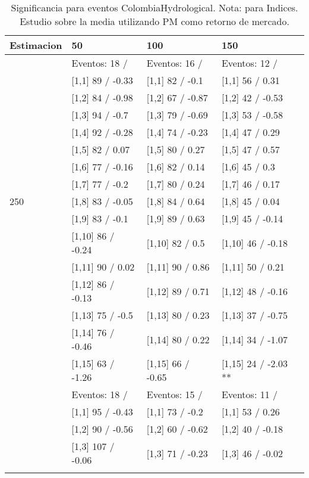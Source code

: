 \begin{table}

\caption{Significancia para eventos ColombiaHydrological. Nota: para Indices. Estudio sobre la media utilizando PM como retorno de mercado.}
\centering
\begin{tabular}[t]{llll}
\toprule
Estimacion & 50 & 100 & 150\\
\midrule
 & Eventos:  18 / & Eventos:  16 / & Eventos:  12 /\\
 & {}[1,1] 89  / -0.33 & {}[1,1] 82  / -0.1 & {}[1,1] 56  / 0.31\\
 & {}[1,2] 84  / -0.98 & {}[1,2] 67  / -0.87 & {}[1,2] 42  / -0.53\\
 & {}[1,3] 94  / -0.7 & {}[1,3] 79  / -0.69 & {}[1,3] 53  / -0.58\\
 & {}[1,4] 92  / -0.28 & {}[1,4] 74  / -0.23 & {}[1,4] 47  / 0.29\\
\addlinespace
 & {}[1,5] 82  / 0.07 & {}[1,5] 80  / 0.27 & {}[1,5] 47  / 0.57\\
 & {}[1,6] 77  / -0.16 & {}[1,6] 82  / 0.14 & {}[1,6] 45  / 0.3\\
 & {}[1,7] 77  / -0.2 & {}[1,7] 80  / 0.24 & {}[1,7] 46  / 0.17\\
250 & {}[1,8] 83  / -0.05 & {}[1,8] 84  / 0.64 & {}[1,8] 45  / 0.04\\
 & {}[1,9] 83  / -0.1 & {}[1,9] 89  / 0.63 & {}[1,9] 45  / -0.14\\
\addlinespace
 & {}[1,10] 86  / -0.24 & {}[1,10] 82  / 0.5 & {}[1,10] 46  / -0.18\\
 & {}[1,11] 90  / 0.02 & {}[1,11] 90  / 0.86 & {}[1,11] 50  / 0.21\\
 & {}[1,12] 86  / -0.13 & {}[1,12] 89  / 0.71 & {}[1,12] 48  / -0.16\\
 & {}[1,13] 75  / -0.5 & {}[1,13] 80  / 0.23 & {}[1,13] 37  / -0.75\\
 & {}[1,14] 76  / -0.46 & {}[1,14] 80  / 0.22 & {}[1,14] 34  / -1.07\\
\addlinespace
 & {}[1,15] 63  / -1.26 & {}[1,15] 66  / -0.65 & {}[1,15] 24  / -2.03 **\\
 & Eventos:  18 / & Eventos:  15 / & Eventos:  11 /\\
 & {}[1,1] 95  / -0.43 & {}[1,1] 73  / -0.2 & {}[1,1] 53  / 0.26\\
 & {}[1,2] 90  / -0.56 & {}[1,2] 60  / -0.62 & {}[1,2] 40  / -0.18\\
 & {}[1,3] 107  / -0.06 & {}[1,3] 71  / -0.23 & {}[1,3] 46  / -0.02\\
\addlinespace

\end{tabular}
\end{table}
